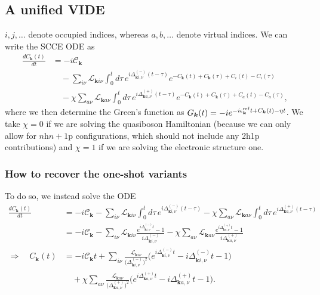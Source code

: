 \subsection{A unified VIDE}
$i,j,\ldots$ denote occupied indices, whereas $a,b,\ldots$ denote virtual indices. We can write the SCCE ODE as 
\begin{align}
\frac{dC_{\bm{k}}(t)}{dt}
&=
-i \mathcal{C}_{\bm{k}}
\nonumber\\
&\quad
-
\sum_{i\nu}
\mathcal{L}_{\bm{k}i\nu}
\int_0^t d\tau\,
e^{i\Delta_{\bm{k}i,\nu}^{(-)}(t-\tau)}
e^{
-C_{\bm{k}}(t)
+C_{\bm{k}}(\tau)
+C_i(t)
-C_i(\tau)
}
\nonumber\\
&\quad
- \chi
\sum_{a\nu}
\mathcal{L}_{\bm{k}a\nu}
\int_0^t d\tau\,
e^{i\Delta_{\bm{k}a,\nu}^{(+)}(t-\tau)}
e^{
-C_{\bm{k}}(t)
+C_{\bm{k}}(\tau)
+C_a(t)
-C_a(\tau)
},
\end{align}
where we then determine the Green's function as $G_{\bm{k}}(t)=-i e^{-i\epsilon_{\bm{k}}^{\rm ref}t+C_{\bm{k}}(t)-\eta t}$. 
{We take $\chi=0$ if we are solving the quasiboson Hamiltonian (because we can only allow for $n$h$n+1$p configurations, which should not include any 2h1p contributions) and $\chi=1$ if we are solving the electronic structure one.}
\subsubsection{How to recover the one-shot variants}
To do so, we instead solve the ODE
\begin{align}
\frac{dC_{\bm{k}}(t)}{dt}
&=
-i \mathcal{C}_{\bm{k}}
-
\sum_{i\nu}
\mathcal{L}_{\bm{k}i\nu}
\int_0^t d\tau\,
e^{i\Delta_{\bm{k}i,\nu}^{(-)}(t-\tau)}
- \chi
\sum_{a\nu}
\mathcal{L}_{\bm{k}a\nu}
\int_0^t d\tau\,
e^{i\Delta_{\bm{k}a,\nu}^{(+)}(t-\tau)}
\nonumber\\
&=
-i \mathcal{C}_{\bm{k}}
-
\sum_{i\nu}
\mathcal{L}_{\bm{k}i\nu}
\frac{e^{i\Delta_{\bm{k}i,\nu}^{(-)}t}-1}{i\Delta_{\bm{k}i,\nu}^{(-)}}
- \chi
\sum_{a\nu}
\mathcal{L}_{\bm{k}a\nu}
\frac{e^{i\Delta_{\bm{k}a,\nu}^{(+)}t}-1}{i\Delta_{\bm{k}a,\nu}^{(+)}}
\nonumber\\
\Longrightarrow\quad
C_{\bm{k}}(t)
&=
-i \mathcal{C}_{\bm{k}} t
+
\sum_{i\nu}
\frac{\mathcal{L}_{\bm{k}i\nu}}{\big(\Delta_{\bm{k}i,\nu}^{(-)}\big)^{2}}
\Big(
e^{i\Delta_{\bm{k}i,\nu}^{(-)}t}
-i\Delta_{\bm{k}i,\nu}^{(-)}t
-1
\Big)
\nonumber\\
&\quad
+ \chi
\sum_{a\nu}
\frac{\mathcal{L}_{\bm{k}a\nu}}{\big(\Delta_{\bm{k}a,\nu}^{(+)}\big)^{2}}
\Big(
e^{i\Delta_{\bm{k}a,\nu}^{(+)}t}
-i\Delta_{\bm{k}a,\nu}^{(+)}t
-1
\Big).
\end{align}

